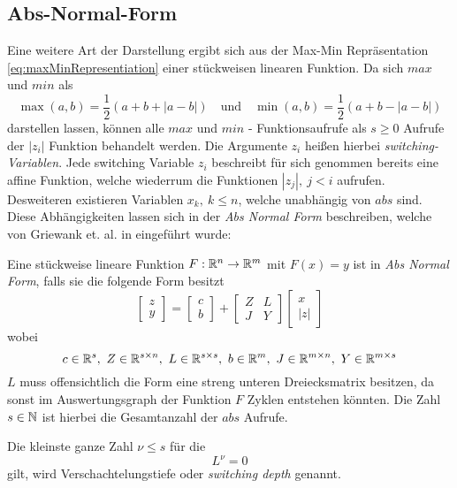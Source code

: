 \subsection{Abs-Normal-Form}
\label{sec:absNormalForm}
Eine weitere Art der Darstellung ergibt sich aus der Max-Min Repräsentation \eqref{eq:maxMinRepresentiation} einer stückweisen linearen Funktion.
Da sich $max$ und $min$ als
\[
\max(a,b) = \frac{1}{2}(a+b + |a-b|)\quad \text{und} \quad \min(a,b) = \frac{1}{2}(a+b - |a-b|)
\]
darstellen lassen, können alle $max$ und $min$ - Funktionsaufrufe als $s\geq 0$ Aufrufe der $|z_i|$ Funktion behandelt werden. Die Argumente $z_i$ heißen hierbei \textit{switching-Variablen}. Jede switching Variable $z_i$ beschreibt für sich genommen bereits eine affine Funktion, welche wiederrum die Funktionen $|z_j|, ~j<i$ aufrufen. Desweiteren existieren Variablen $x_k, ~k\leq n$, welche unabhängig von $abs$ sind. Diese Abhängigkeiten lassen sich in der \textit{Abs Normal Form} beschreiben, welche von Griewank et. al. in \cite{plan} eingeführt wurde:
\begin{definition}
 Eine stückweise lineare Funktion $F:\mathbb{R}^n\to \mathbb{R}^m$ mit $F(x) = y$ ist in \textit{Abs Normal Form}, falls sie die folgende Form besitzt
 \begin{equation}
\label{eq:absNormalForm}
  \begin{bmatrix}
   z\\y
  \end{bmatrix}
  =
  \begin{bmatrix}
   c\\b
  \end{bmatrix}
  +
  \begin{bmatrix}
   Z & L\\
   J & Y
  \end{bmatrix}
  \begin{bmatrix}
   x\\|z|
  \end{bmatrix}
 \end{equation}
wobei 
\[
c\in \mathbb{R}^s, ~ Z\in \mathbb{R}^{s\times n},~ L\in\mathbb{R}^{s\times s}, ~ b\in\mathbb{R}^m, ~ J\in\mathbb{R}^{m\times n}, ~ Y\in \mathbb{R}^{m\times s} 
\]
$L$ muss offensichtlich die Form eine streng unteren Dreiecksmatrix besitzen, da sonst im Auswertungsgraph der Funktion $F$ Zyklen entstehen könnten. Die Zahl $s\in \mathbb{N}$ ist hierbei die Gesamtanzahl der $abs$ Aufrufe.
\end{definition}
Die kleinste ganze Zahl $\nu \leq s$ für die 
\[
 L^\nu =0
\]
gilt, wird Verschachtelungstiefe oder \textit{switching depth} genannt. 
